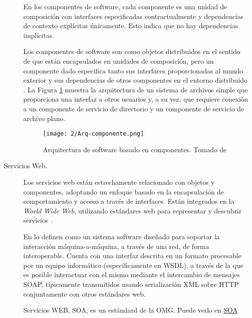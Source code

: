 \begin{description}
	En los \gls{componentes} de software, cada componente es  una unidad de composición con interfaces especificadas contractualmente y dependencias de contexto explícitas únicamente. Esto indica que no hay dependencias implícitas. 
	
	Los componentes de software son como objetos distribuidos en el sentido de que están encapsulados en 	unidades de composición, pero un componente dado especifica tanto sus interfaces proporcionadas al mundo exterior y sus dependencias de otros componentes en el entorno distribuido  \cite{Szyperski2002}.	
	La Figura \ref{fig:Arq-componente} muestra la arquitectura de un sistema de archivos simple que proporciona una interfaz a otros usuarios y, a su vez, 	que requiere conexión a un componente de servicio de directorio y un componente de servicio de archivo plano.
	
	\begin{figure} 
		\begin{center}%
		\texttt{[image: 2/Arq-componente.png]}
		\caption{Arquitectura de software basado en componentes. Tomado de \cite{Coulouris2011}}
		\label{fig:Arq-componente}
	 \end{center} 
 \end{figure} 
	
	\item [Servicios Web.]    
	Los \gls{servicios web} están estrechamente relacionado con objetos y componentes,  adoptando un enfoque basado en la encapsulación de comportamiento y acceso a través de interfaces. Están integrados en la \textit{World Wide Web}, utilizando estándares web para representar y descubrir servicios \cite{Erl2007}. 
	
	En \cite{W3C2022} lo definen como un sistema software diseñado para soportar la interacción máquina-a-máquina, a través de una red, de forma interoperable. Cuenta con una interfaz descrita en un formato procesable por un equipo informático (específicamente en WSDL), a través de la que es posible interactuar con el mismo mediante el intercambio de mensajes SOAP, típicamente transmitidos usando serialización XML sobre HTTP conjuntamente con otros estándares web.
	 
	
		\begin{tcolorbox}
		[colback=red!5!white,colframe=red!75!black,fonttitle=\bfseries,title=Servicios WEB]
			Servicios WEB, SOA, es un est\'andard de la OMG. Puede verlo en \href{https://www.omg.org/technology/readingroom/SOA.htm} {SOA}	
		\end{tcolorbox}
	


\end{description}
